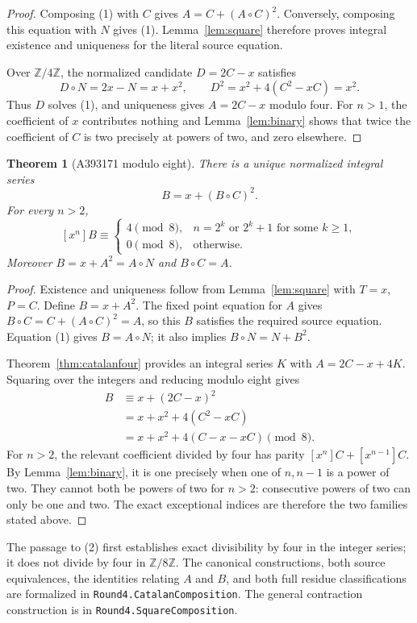 \documentclass[11pt,a4paper]{article}
\newtheorem{theorem}{Theorem}[section]
\theoremstyle{remark}
\newcommand{\Z}{\mathbb Z}
\begin{document}
\begin{proof}
Composing (1) with $C$ gives
$A=C+(A\circ C)^2$. Conversely, composing this equation with $N$
gives (1). Lemma~\ref{lem:square} therefore proves integral existence
and uniqueness for the literal source equation.

Over $\Z/4\Z$, the normalized candidate $D=2C-x$ satisfies
\[
 D\circ N=2x-N=x+x^2,
 \qquad D^2=x^2+4(C^2-xC)=x^2.
\]
Thus $D$ solves (1), and uniqueness gives $A=2C-x$ modulo four. For
$n>1$, the coefficient of $x$ contributes nothing and Lemma~\ref{lem:binary}
shows that twice the coefficient of $C$ is two precisely at powers of
two, and zero elsewhere.
\end{proof}

\begin{theorem}[A393171 modulo eight]\label{thm:catalaneight}
There is a unique normalized integral series
\[
 B=x+(B\circ C)^2.
\]
For every $n>2$,
\[
 [x^n]B\equiv
 \begin{cases}
 4\pmod8,& n=2^k\text{ or }2^k+1\text{ for some }k\ge1,\\
 0\pmod8,& \text{otherwise}.
 \end{cases}
\]
Moreover $B=x+A^2=A\circ N$ and $B\circ C=A$.
\end{theorem}

\begin{proof}
Existence and uniqueness follow from Lemma~\ref{lem:square} with $T=x$,
$P=C$. Define $B=x+A^2$. The fixed point equation for $A$ gives
$B\circ C=C+(A\circ C)^2=A$, so this $B$ satisfies the required source
equation. Equation (1) gives $B=A\circ N$; it also implies
$B\circ N=N+B^2$.

Theorem~\ref{thm:catalanfour} provides an integral series $K$ with
$A=2C-x+4K$. Squaring over the integers and reducing modulo eight gives
\[
 \begin{aligned}
 B&\equiv x+(2C-x)^2\\
  & =x+x^2+4(C^2-xC)\\
  & =x+x^2+4(C-x-xC)\pmod8.
 \end{aligned}\tag{2}
\]
For $n>2$, the relevant coefficient divided by four has parity
$[x^n]C+[x^{n-1}]C$. By Lemma~\ref{lem:binary}, it is one precisely
when one of $n,n-1$ is a power of two. They cannot both be powers of two
for $n>2$: consecutive powers of two can only be one and two. The exact
exceptional indices are therefore the two families stated above.
\end{proof}

The passage to (2) first establishes exact divisibility by four in the
integer series; it does not divide by four in $\Z/8\Z$. The canonical
constructions, both source equivalences, the identities relating $A$ and
$B$, and both full residue classifications are formalized in
\texttt{Round4.CatalanComposition}. The general contraction construction
is in \texttt{Round4.SquareComposition}.
\end{document}
